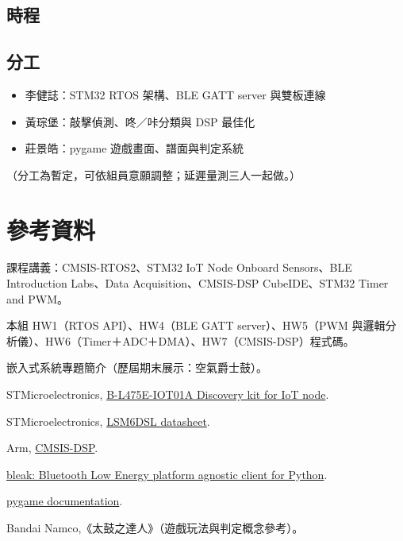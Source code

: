 \documentclass[12pt]{extarticle}
\begin{document}
\subsection*{時程}

\subsection*{分工}
\begin{itemize}
  \item 李健誌：STM32 RTOS 架構、BLE GATT server 與雙板連線
  \item 黃琮堡：敲擊偵測、咚／咔分類與 DSP 最佳化
  \item 莊景皓：pygame 遊戲畫面、譜面與判定系統
\end{itemize}
（分工為暫定，可依組員意願調整；延遲量測三人一起做。）

\section{參考資料}
\begin{enumerate}[label={[\arabic*]}]
  \item 課程講義：CMSIS-RTOS2、STM32 IoT Node Onboard Sensors、BLE Introduction Labs、Data Acquisition、CMSIS-DSP CubeIDE、STM32 Timer and PWM。
  \item 本組 HW1（RTOS API）、HW4（BLE GATT server）、HW5（PWM 與邏輯分析儀）、HW6（Timer＋ADC＋DMA）、HW7（CMSIS-DSP）程式碼。
  \item 嵌入式系統專題簡介（歷屆期末展示：空氣爵士鼓）。
  \item STMicroelectronics, \href{https://www.st.com/en/evaluation-tools/b-l475e-iot01a.html}{B-L475E-IOT01A Discovery kit for IoT node}.
  \item STMicroelectronics, \href{https://www.st.com/resource/en/datasheet/lsm6dsl.pdf}{LSM6DSL datasheet}.
  \item Arm, \href{https://github.com/ARM-software/CMSIS-DSP}{CMSIS-DSP}.
  \item \href{https://github.com/hbldh/bleak}{bleak: Bluetooth Low Energy platform agnostic client for Python}.
  \item \href{https://www.pygame.org/docs/}{pygame documentation}.
  \item Bandai Namco,《太鼓之達人》（遊戲玩法與判定概念參考）。
\end{enumerate}
\end{document}
